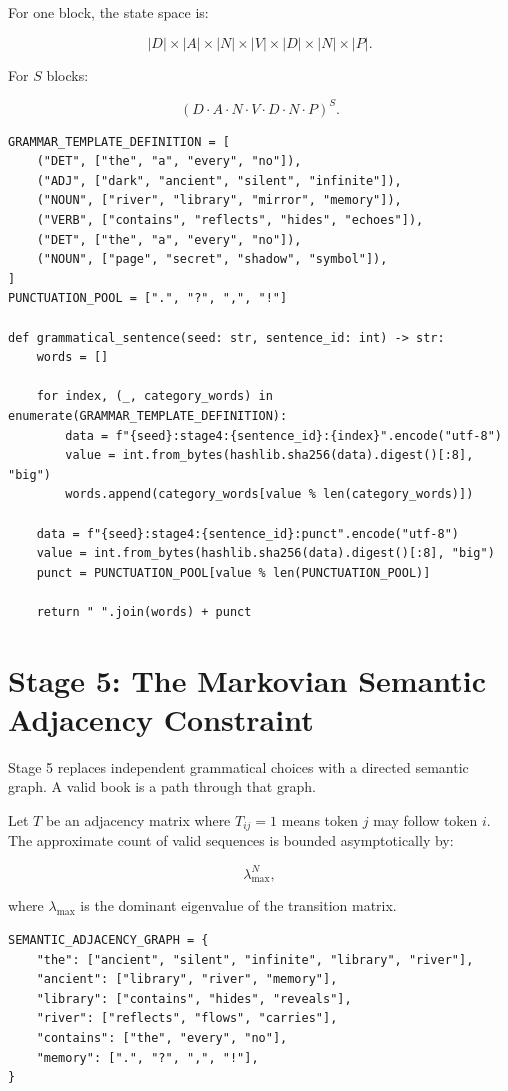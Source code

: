 \documentclass[11pt,a4paper]{article}
\begin{document}
For one block, the state space is:

\[
|D| \times |A| \times |N| \times |V| \times |D| \times |N| \times |P|.
\]

For $S$ blocks:

\[
(D \cdot A \cdot N \cdot V \cdot D \cdot N \cdot P)^S.
\]

\begin{lstlisting}[style=pythonstyle]
GRAMMAR_TEMPLATE_DEFINITION = [
    ("DET", ["the", "a", "every", "no"]),
    ("ADJ", ["dark", "ancient", "silent", "infinite"]),
    ("NOUN", ["river", "library", "mirror", "memory"]),
    ("VERB", ["contains", "reflects", "hides", "echoes"]),
    ("DET", ["the", "a", "every", "no"]),
    ("NOUN", ["page", "secret", "shadow", "symbol"]),
]
PUNCTUATION_POOL = [".", "?", ",", "!"]

def grammatical_sentence(seed: str, sentence_id: int) -> str:
    words = []

    for index, (_, category_words) in enumerate(GRAMMAR_TEMPLATE_DEFINITION):
        data = f"{seed}:stage4:{sentence_id}:{index}".encode("utf-8")
        value = int.from_bytes(hashlib.sha256(data).digest()[:8], "big")
        words.append(category_words[value % len(category_words)])

    data = f"{seed}:stage4:{sentence_id}:punct".encode("utf-8")
    value = int.from_bytes(hashlib.sha256(data).digest()[:8], "big")
    punct = PUNCTUATION_POOL[value % len(PUNCTUATION_POOL)]

    return " ".join(words) + punct
\end{lstlisting}

\section{Stage 5: The Markovian Semantic Adjacency Constraint}

Stage 5 replaces independent grammatical choices with a directed semantic graph. A valid book is a path through that graph.

Let $T$ be an adjacency matrix where $T_{ij}=1$ means token $j$ may follow token $i$. The approximate count of valid sequences is bounded asymptotically by:

\[
\lambda_{\max}^{N},
\]

where $\lambda_{\max}$ is the dominant eigenvalue of the transition matrix.

\begin{lstlisting}[style=pythonstyle]
SEMANTIC_ADJACENCY_GRAPH = {
    "the": ["ancient", "silent", "infinite", "library", "river"],
    "ancient": ["library", "river", "memory"],
    "library": ["contains", "hides", "reveals"],
    "river": ["reflects", "flows", "carries"],
    "contains": ["the", "every", "no"],
    "memory": [".", "?", ",", "!"],
}
\end{lstlisting}
\end{document}

